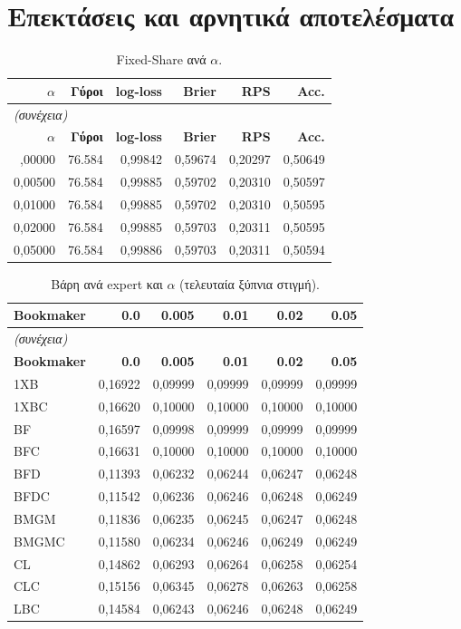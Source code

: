 \section{Επεκτάσεις και αρνητικά αποτελέσματα}
{\small
\begin{longtable}{@{}rrrrrr@{}}
\caption{Fixed-Share ανά $\alpha$.}\label{app:fs}\\
\toprule \textbf{$\alpha$} & \textbf{Γύροι} & \textbf{log-loss} & \textbf{Brier} & \textbf{RPS} & \textbf{Acc.} \\\midrule\endfirsthead
\multicolumn{6}{l}{\emph{(συνέχεια)}}\\\toprule \textbf{$\alpha$} & \textbf{Γύροι} & \textbf{log-loss} & \textbf{Brier} & \textbf{RPS} & \textbf{Acc.} \\\midrule\endhead
\bottomrule\endfoot
0,00000 & 76.584 & 0,99842 & 0,59674 & 0,20297 & 0,50649 \\
0,00500 & 76.584 & 0,99885 & 0,59702 & 0,20310 & 0,50597 \\
0,01000 & 76.584 & 0,99885 & 0,59702 & 0,20310 & 0,50595 \\
0,02000 & 76.584 & 0,99885 & 0,59703 & 0,20311 & 0,50595 \\
0,05000 & 76.584 & 0,99886 & 0,59703 & 0,20311 & 0,50594 \\
\end{longtable}
}

{\small
\begin{longtable}{@{}lrrrrr@{}}
\caption{Βάρη ανά expert και $\alpha$ (τελευταία ξύπνια στιγμή).}\label{app:fsw}\\
\toprule \textbf{Bookmaker} & \textbf{0.0} & \textbf{0.005} & \textbf{0.01} & \textbf{0.02} & \textbf{0.05} \\\midrule\endfirsthead
\multicolumn{6}{l}{\emph{(συνέχεια)}}\\\toprule \textbf{Bookmaker} & \textbf{0.0} & \textbf{0.005} & \textbf{0.01} & \textbf{0.02} & \textbf{0.05} \\\midrule\endhead
\bottomrule\endfoot
1XB & 0,16922 & 0,09999 & 0,09999 & 0,09999 & 0,09999 \\
1XBC & 0,16620 & 0,10000 & 0,10000 & 0,10000 & 0,10000 \\
BF & 0,16597 & 0,09998 & 0,09999 & 0,09999 & 0,09999 \\
BFC & 0,16631 & 0,10000 & 0,10000 & 0,10000 & 0,10000 \\
BFD & 0,11393 & 0,06232 & 0,06244 & 0,06247 & 0,06248 \\
BFDC & 0,11542 & 0,06236 & 0,06246 & 0,06248 & 0,06249 \\
BMGM & 0,11836 & 0,06235 & 0,06245 & 0,06247 & 0,06248 \\
BMGMC & 0,11580 & 0,06234 & 0,06246 & 0,06249 & 0,06249 \\
CL & 0,14862 & 0,06293 & 0,06264 & 0,06258 & 0,06254 \\
CLC & 0,15156 & 0,06345 & 0,06278 & 0,06263 & 0,06258 \\
LBC & 0,14584 & 0,06243 & 0,06246 & 0,06248 & 0,06249 \\
\end{longtable}
}

